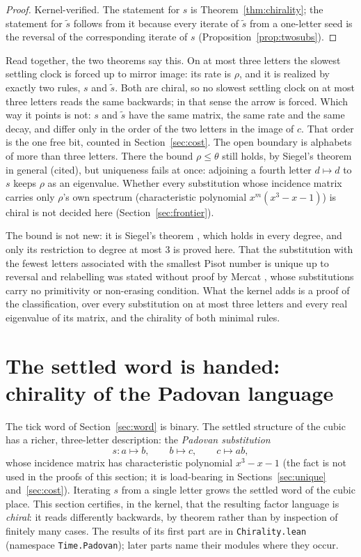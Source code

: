 \documentclass[11pt]{amsart}
\theoremstyle{plain}
\theoremstyle{definition}
\theoremstyle{remark}
\begin{document}
\begin{proof}
Kernel-verified. The statement for $s$ is Theorem~\ref{thm:chirality}; the statement for
$\tilde s$ follows from it because every iterate of $\tilde s$ from a one-letter seed is the
reversal of the corresponding iterate of $s$ (Proposition~\ref{prop:twosubs}).
\end{proof}

Read together, the two theorems say this. On at most three letters the slowest settling clock
is forced up to mirror image: its rate is $\rho$, and it is realized by exactly two rules, $s$
and $\tilde s$. Both are chiral, so no slowest settling clock on at most three letters reads the
same backwards; in that sense the arrow is forced. Which way it points is not: $s$ and
$\tilde s$ have the same matrix, the same rate and the same decay, and differ only in the order
of the two letters in the image of $c$. That order is the one free bit, counted in
Section~\ref{sec:cost}. The open boundary is alphabets of more than three letters. There the
bound $\rho \le \theta$ still holds, by Siegel's theorem in general (cited), but uniqueness
fails at once: adjoining a fourth letter $d \mapsto d$ to $s$ keeps $\rho$ as an eigenvalue.
Whether every substitution whose incidence matrix carries only $\rho$'s own spectrum
(characteristic polynomial $x^m(x^3 - x - 1)$) is chiral is not decided here
(Section~\ref{sec:frontier}).

The bound is not new: it is Siegel's theorem \cite{siegel1944}, which holds in every degree,
and only its restriction to degree at most $3$ is proved here. That the substitution with the
fewest letters associated with the smallest Pisot number is unique up to reversal and
relabelling was stated without proof by Mercat \cite{mercat2020}, whose substitutions carry no
primitivity or non-erasing condition. What the kernel adds is a proof of the classification,
over every substitution on at most three letters and every real eigenvalue of its matrix,
and the chirality of both minimal rules.

\section{The settled word is handed: chirality of the Padovan language}
\label{sec:chirality}

The tick word of Section~\ref{sec:word} is binary. The settled structure of the cubic has a
richer, three-letter description: the \emph{Padovan substitution}
\[
  s \colon a \mapsto b, \qquad b \mapsto c, \qquad c \mapsto ab,
\]
whose incidence matrix has characteristic polynomial $x^{3} - x - 1$ (the fact is not used in
the proofs of this section; it is load-bearing in Sections~\ref{sec:unique} and~\ref{sec:cost}). Iterating $s$ from a single letter grows the settled
word of the cubic place. This section certifies, in the kernel, that the resulting factor
language is \emph{chiral}: it reads differently backwards, by theorem rather than by
inspection of finitely many cases. The results of its first part are in \texttt{Chirality.lean}
(namespace \texttt{Time.Padovan}); later parts name their modules where they occur.
\end{document}
